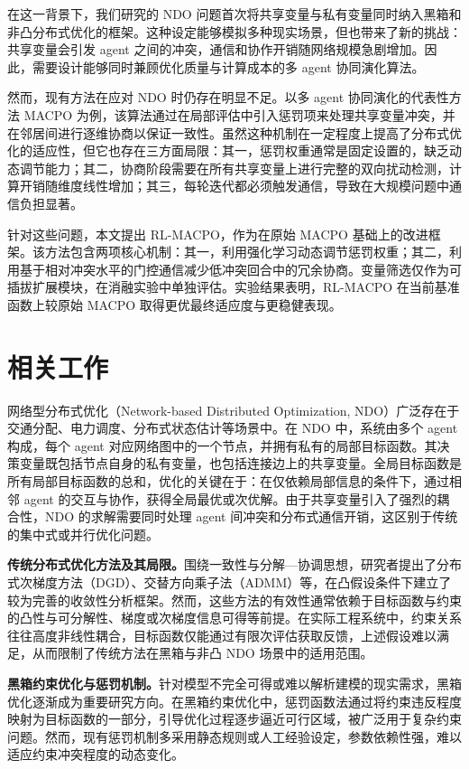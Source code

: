 \documentclass[conference]{IEEEtran}
\begin{document}
在这一背景下，我们研究的 NDO
问题首次将共享变量与私有变量同时纳入黑箱和非凸分布式优化的框架。这种设定能够模拟多种现实场景，但也带来了新的挑战：共享变量会引发
agent
之间的冲突，通信和协作开销随网络规模急剧增加。因此，需要设计能够同时兼顾优化质量与计算成本的多
agent 协同演化算法。

然而，现有方法在应对 NDO 时仍存在明显不足。以多 agent
协同演化的代表性方法 MACPO
为例，该算法通过在局部评估中引入惩罚项来处理共享变量冲突，并在邻居间进行逐维协商以保证一致性。虽然这种机制在一定程度上提高了分布式优化的适应性，但它也存在三方面局限：其一，惩罚权重通常是固定设置的，缺乏动态调节能力；其二，协商阶段需要在所有共享变量上进行完整的双向扰动检测，计算开销随维度线性增加；其三，每轮迭代都必须触发通信，导致在大规模问题中通信负担显著。

针对这些问题，本文提出 RL-MACPO，作为在原始 MACPO 基础上的改进框架。该方法包含两项核心机制：其一，利用强化学习动态调节惩罚权重；其二，利用基于相对冲突水平的门控通信减少低冲突回合中的冗余协商。变量筛选仅作为可插拔扩展模块，在消融实验中单独评估。实验结果表明，RL-MACPO 在当前基准函数上较原始 MACPO 取得更优最终适应度与更稳健表现。

\section{相关工作}\label{ux76f8ux5173ux5de5ux4f5c}

网络型分布式优化（Network-based Distributed Optimization,
NDO）广泛存在于交通分配、电力调度、分布式状态估计等场景中。在 NDO
中，系统由多个 agent 构成，每个 agent
对应网络图中的一个节点，并拥有私有的局部目标函数。其决策变量既包括节点自身的私有变量，也包括连接边上的共享变量。全局目标函数是所有局部目标函数的总和，优化的关键在于：在仅依赖局部信息的条件下，通过相邻
agent
的交互与协作，获得全局最优或次优解。由于共享变量引入了强烈的耦合性，NDO
的求解需要同时处理 agent
间冲突和分布式通信开销，这区别于传统的集中式或并行优化问题。

\textbf{传统分布式优化方法及其局限。}围绕一致性与分解—协调思想，研究者提出了分布式次梯度方法（DGD）、交替方向乘子法（ADMM）等，在凸假设条件下建立了较为完善的收敛性分析框架。然而，这些方法的有效性通常依赖于目标函数与约束的凸性与可分解性、梯度或次梯度信息可得等前提。在实际工程系统中，约束关系往往高度非线性耦合，目标函数仅能通过有限次评估获取反馈，上述假设难以满足，从而限制了传统方法在黑箱与非凸 NDO 场景中的适用范围。

\textbf{黑箱约束优化与惩罚机制。}针对模型不完全可得或难以解析建模的现实需求，黑箱优化逐渐成为重要研究方向。在黑箱约束优化中，惩罚函数法通过将约束违反程度映射为目标函数的一部分，引导优化过程逐步逼近可行区域，被广泛用于复杂约束问题。然而，现有惩罚机制多采用静态规则或人工经验设定，参数依赖性强，难以适应约束冲突程度的动态变化。
\end{document}
